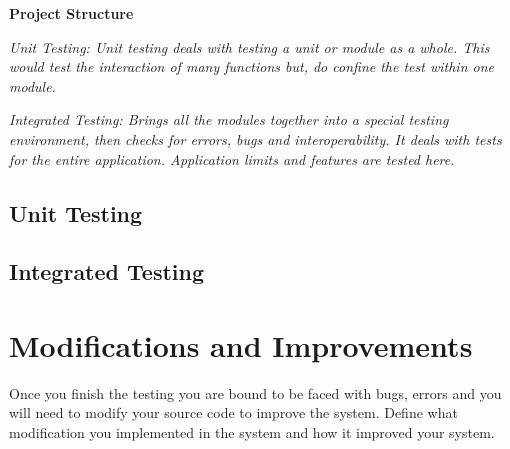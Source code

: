 \textbf{Project Structure}

\textit{Unit Testing: Unit testing deals with testing a unit or module as a whole. This would test the interaction of many functions but, do confine the test within one module.}

\textit{Integrated Testing: Brings all the modules together into a special testing environment, then checks for errors, bugs and interoperability. It deals with tests for the entire application. Application limits and features are tested here.}

\subsection{Unit Testing}

\subsection{Integrated Testing}

\section{Modifications and Improvements}
Once you finish the testing you are bound to be faced with bugs, errors and you will need to modify your source code to improve the system. Define what modification you implemented in the system and how it improved your system.
